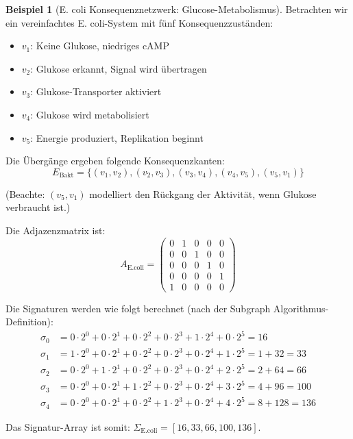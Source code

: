 \documentclass[a4paper,12pt]{article}
\theoremstyle{definition}
\newtheorem{beispiel}{Beispiel}
\begin{document}
\begin{beispiel}[E. coli Konsequenznetzwerk: Glucose-Metabolismus]
\label{ex:ecoli_netzwerk}
Betrachten wir ein vereinfachtes E. coli-System mit fünf Konsequenzzuständen:

\begin{itemize}
    \item $v_1$: Keine Glukose, niedriges cAMP
    \item $v_2$: Glukose erkannt, Signal wird übertragen
    \item $v_3$: Glukose-Transporter aktiviert
    \item $v_4$: Glukose wird metabolisiert
    \item $v_5$: Energie produziert, Replikation beginnt
\end{itemize}

Die Übergänge ergeben folgende Konsequenzkanten:
\[
E_{\text{Bakt}} = \{(v_1, v_2), (v_2, v_3), (v_3, v_4), (v_4, v_5), (v_5, v_1)\}
\]

(Beachte: $(v_5, v_1)$ modelliert den Rückgang der Aktivität, wenn Glukose verbraucht ist.)

Die Adjazenzmatrix ist:
\[
A_{\text{E.coli}} = \begin{pmatrix}
0 & 1 & 0 & 0 & 0 \\
0 & 0 & 1 & 0 & 0 \\
0 & 0 & 0 & 1 & 0 \\
0 & 0 & 0 & 0 & 1 \\
1 & 0 & 0 & 0 & 0
\end{pmatrix}
\]

Die Signaturen werden wie folgt berechnet (nach der Subgraph Algorithmus-Definition):
\begin{align*}
\sigma_0 &= 0 \cdot 2^0 + 0 \cdot 2^1 + 0 \cdot 2^2 + 0 \cdot 2^3 + 1 \cdot 2^4 + 0 \cdot 2^5 = 16 \\
\sigma_1 &= 1 \cdot 2^0 + 0 \cdot 2^1 + 0 \cdot 2^2 + 0 \cdot 2^3 + 0 \cdot 2^4 + 1 \cdot 2^5 = 1 + 32 = 33 \\
\sigma_2 &= 0 \cdot 2^0 + 1 \cdot 2^1 + 0 \cdot 2^2 + 0 \cdot 2^3 + 0 \cdot 2^4 + 2 \cdot 2^5 = 2 + 64 = 66 \\
\sigma_3 &= 0 \cdot 2^0 + 0 \cdot 2^1 + 1 \cdot 2^2 + 0 \cdot 2^3 + 0 \cdot 2^4 + 3 \cdot 2^5 = 4 + 96 = 100 \\
\sigma_4 &= 0 \cdot 2^0 + 0 \cdot 2^1 + 0 \cdot 2^2 + 1 \cdot 2^3 + 0 \cdot 2^4 + 4 \cdot 2^5 = 8 + 128 = 136
\end{align*}

Das Signatur-Array ist somit: $\Sigma_{\text{E.coli}} = [16, 33, 66, 100, 136]$.
\end{beispiel}
\end{document}
